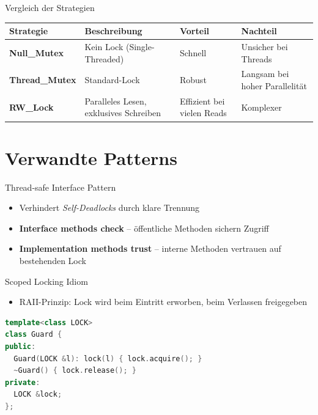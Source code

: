\documentclass[aspectratio=169,10pt]{beamer}
\begin{document}
\begin{frame}{Vergleich der Strategien}
  \centering
  {\small
  \setlength{\tabcolsep}{6pt}
  \renewcommand{\arraystretch}{1.25}
  \begin{tabularx}{0.92\linewidth}{>{\bfseries}lYYY}
    \toprule
    Strategie & Beschreibung & Vorteil & Nachteil \\
    \midrule
    Null\_Mutex & Kein Lock (Single-Threaded) & Schnell & Unsicher bei Threads \\
    Thread\_Mutex & Standard-Lock & Robust & Langsam bei hoher Parallelit\"at \\
    RW\_Lock & Paralleles Lesen, exklusives Schreiben & Effizient bei vielen Reads & Komplexer \\
    \bottomrule
  \end{tabularx}
  }
\end{frame}

\section{Verwandte Patterns}
\begin{frame}{Thread-safe Interface Pattern}
  \begin{itemize}
    \item Verhindert \textit{Self-Deadlocks} durch klare Trennung
    \item \textbf{Interface methods check} -- \"offentliche Methoden sichern Zugriff
    \item \textbf{Implementation methods trust} -- interne Methoden vertrauen auf bestehenden Lock
  \end{itemize}
\end{frame}

\begin{frame}[fragile]{Scoped Locking Idiom}
  \begin{itemize}
    \item RAII-Prinzip: Lock wird beim Eintritt erworben, beim Verlassen freigegeben
  \end{itemize}
  \vspace{1em}
  \begin{lstlisting}[language=C++]
template<class LOCK>
class Guard {
public:
  Guard(LOCK &l): lock(l) { lock.acquire(); }
  ~Guard() { lock.release(); }
private:
  LOCK &lock;
};
  \end{lstlisting}
\end{frame}
\end{document}
